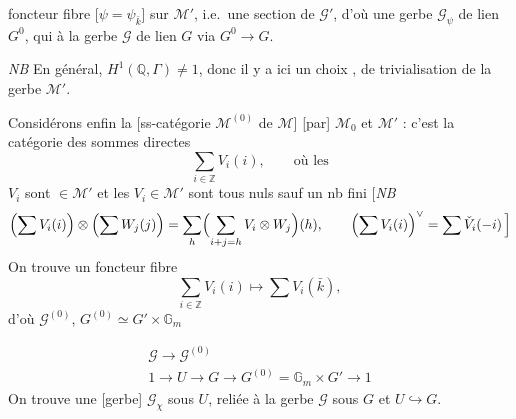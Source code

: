 \documentclass[11pt,a4paper]{article}
\begin{document}
foncteur fibre [$\psi = \psi_{\bar{k}}$] sur $\mathcal{M}'$, i.e.\ une section
de $\mathcal{G}'$, d'où une \struck{\ill{}}  gerbe
$\mathcal{G}_{\psi}$ de lien $G^{0}$, qui \struck{\ill{}} \struck{\ill{}}
 à la gerbe $\mathcal{G}$ de lien $G$ via $G^{0} \to G$.

\emph{NB} En général, $H^{1}(\mathbb{Q}, \Gamma) \neq 1$, donc il y a ici un
choix , \ill{} de trivialisation de la gerbe $\mathcal{M}'$.

Considérons enfin la  [ss-catégorie 
$\mathcal{M}^{(0)}$ de $\mathcal{M}$] \struck{\ill{}} [par] $\mathcal{M}_{0}$
et $\mathcal{M}'$ : c'est la catégorie  des sommes directes
\[
  \sum_{i \in \mathbb{Z}} V_{i}(i) , \qquad \text{où les}
\]
$V_{i}$ sont $\in \mathcal{M}'$ et les $V_{i} \in \mathcal{M}'$ sont tous nuls
sauf un nb fini [\emph{NB}
\[
  \Bigl(\sum V_{i}(i)\Bigr) \otimes \Bigl(\sum W_{j}(j)\Bigr)
  = \sum_{h} \Bigl(\sum_{i+j=h} V_{i} \otimes W_{j}\Bigr)(h) ,
  \qquad
  \Bigl(\sum V_{i}(i)\Bigr)^{\vee} = \sum \check{V}_{i}(-i) \,\Bigr]
\]
On trouve un foncteur fibre
\[
  \sum_{i \in \mathbb{Z}} V_{i}(i) \longmapsto \sum V_{i}(\bar{k}) ,
\]
d'où $\mathcal{G}^{(0)}$, $G^{(0)} \simeq G' \times \mathbb{G}_{m}$


\[
  \begin{array}{l}
    \mathcal{G} \longrightarrow \mathcal{G}^{(0)} \\[2pt]
    1 \longrightarrow U \longrightarrow G \longrightarrow G^{(0)} =
      \mathbb{G}_{m} \times G' \longrightarrow 1
  \end{array}
\]
On trouve une  [gerbe] $\mathcal{G}_{\chi}$ sous $U$,
reliée à la gerbe $\mathcal{G}$ sous $G$ \struck{\ill{}} et $U
\hookrightarrow G$.


\end{document}
